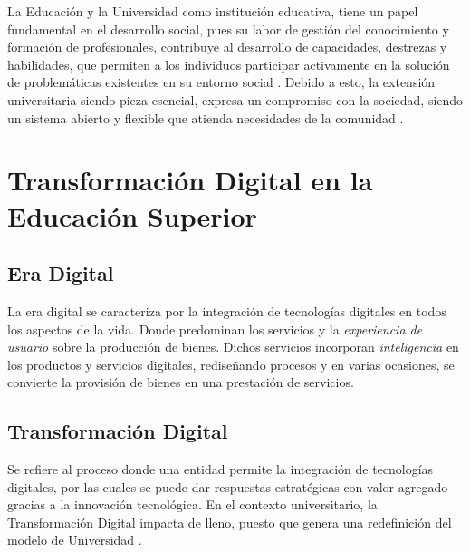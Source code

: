 La Educación y la Universidad como institución educativa, tiene un papel fundamental en el desarrollo social,
pues su labor de gestión del conocimiento y formación de profesionales, contribuye al desarrollo de capacidades,
destrezas y habilidades, que permiten a los individuos participar activamente en la solución de problemáticas existentes
en su entorno social \cite{loor2022universidadSociedad}. Debido a esto, la extensión universitaria siendo pieza esencial,
expresa un compromiso con la sociedad, siendo un sistema abierto y flexible que atienda necesidades de la 
comunidad \cite{cedeña2012extensionDesarrollo}.

\section{Transformación Digital en la Educación Superior}
    \subsection{Era Digital}
    La era digital se caracteriza por la integración de tecnologías digitales en todos los aspectos de la vida. Donde
    predominan los servicios y la \textit{\guillemetleft{}experiencia de usuario\guillemetright{}} sobre la producción de
    bienes. Dichos servicios incorporan \textit{\guillemetleft{}inteligencia\guillemetright{}} en los productos y 
    servicios digitales, rediseñando procesos y en varias ocasiones, se convierte la provisión de bienes en una prestación 
    de servicios\cite{chinkes2019transformacionDigital}.

    \subsection{Transformación Digital}
    Se refiere al proceso donde una entidad permite la integración de tecnologías digitales, por las cuales se puede dar
    respuestas estratégicas con valor agregado gracias a la innovación tecnológica. En el contexto universitario, la
    Transformación Digital impacta de lleno, puesto que genera una redefinición del modelo de Universidad 
    \cite{giusti2023transformacionDigital}.

